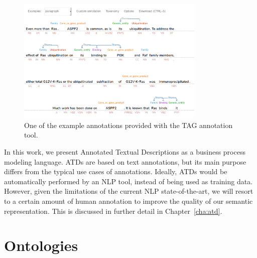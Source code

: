 \begin{figure}[htb]
  \centering
  \includegraphics[width=0.8\textwidth]{figures/tag}
  \caption{One of the example annotations provided with the TAG
    annotation tool.}
  \label{fig:tag}
\end{figure}

In this work, we present Annotated Textual Descriptions as a business process
modeling language. ATDs are based on text annotations, but its main purpose
differs from the typical use cases of annotations. Ideally, ATDs would be
automatically performed by an NLP tool, instead of being used as training data.
However, given the limitations of the current NLP state-of-the-art, we will
resort to a certain amount of human annotation to improve the quality of our
semantic representation. This is discussed in further detail in Chapter~\ref{cha:atd}.

\section{Ontologies}
\label{sec:background_ontologies}

